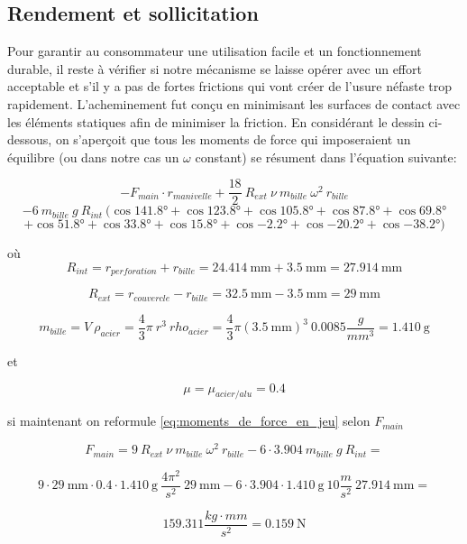 \subsection{Rendement et sollicitation}
Pour garantir au consommateur une utilisation facile et un fonctionnement durable, il reste à vérifier si notre mécanisme se laisse opérer avec un effort acceptable et s'il y a pas de fortes frictions qui vont créer de l'usure néfaste trop rapidement. L'acheminement fut conçu en minimisant les surfaces de contact avec les éléments statiques afin de minimiser la friction. En considérant le dessin ci-dessous, on s'aperçoit que tous les moments de force qui imposeraient un équilibre (ou dans notre cas un $\omega$ constant) se résument dans l'équation suivante:

\[-F_{main} \cdot r_{manivelle} + \frac{18}{2} \ R_{ext} \ \nu \ m_{bille} \ \omega^{2} \ r_{bille}\] \[- 6 \ m_{bille} \ g \ R_{int} \ (\cos{\ang{141.8}} + \cos{\ang{123.8}} + \cos{\ang{105.8}} + \cos{\ang{87.8}} + \cos{\ang{69.8}}\]
\begin{equation}
    + \cos{\ang{51.8}} + \cos{\ang{33.8}} + \cos{\ang{15.8}} + \cos{\ang{-2.2}} + \cos{\ang{-20.2}} + \cos{\ang{-38.2}})
\label{eq:moments_de_force_en_jeu}
\end{equation}

où \[R_{int} = r_{perforation} + r_{bille} = \SI{24.414}{\milli\metre} + \SI{3.5}{\milli\metre} = \SI{27.914}{\milli\metre}\]

\[R_{ext} = r_{couvercle} - r_{bille} = \SI{32.5}{\milli\metre} - \SI{3.5}{\milli\metre} = \SI{29}{\milli\metre} \]

\[m_{bille} = V \ \rho_{acier} = \frac{4}{3}\pi \ r^{3} \ rho_{acier} = \frac{4}{3} \pi (\SI{3.5}{\milli\metre})^{3} \ 0.0085 \frac{g}{mm^{3}} = \SI{1.410}{\g}\]

et

\[ \mu = \mu_{acier/alu} = 0.4\]

si maintenant on reformule \ref{eq:moments_de_force_en_jeu} selon $F_{main}$

\[F_{main} = 9 \ R_{ext} \ \nu \ m_{bille} \ \omega^{2} \ r_{bille} - 6 \cdot 3.904 \ m_{bille} \ g \ R_{int} = \]

\[9 \cdot \SI{29}{\milli\metre} \cdot 0.4 \cdot \SI{1.410}{\g} \ \frac{4 \pi^{2}}{s^{2}} \ \SI{29}{\milli\metre} - 6 \cdot 3.904\cdot \SI{1.410}{\g} \ 10\frac{m}{s^{2}} \ \SI{27.914}{\milli\metre} =\]

\begin{equation}
    159.311 \frac{kg\cdot mm}{s^{2}} = \SI{0.159}{\N}
    \label{eq:F_main}
\end{equation}

